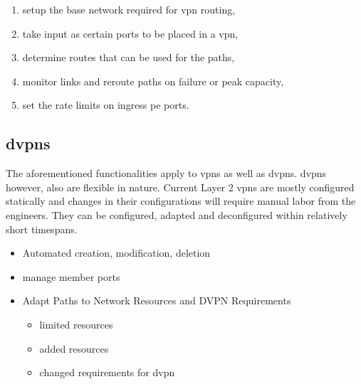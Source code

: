 \begin{enumerate}
	\item setup the base network required for \ac{vpn} routing,
	\item take input as certain ports to be placed in a \ac{vpn},
	\item determine routes that can be used for the paths,
	\item monitor links and reroute paths on failure or peak capacity,
	\item set the rate limits on ingress \ac{pe} ports.
\end{enumerate}





\subsection{\acsp{dvpn}} %
\label{sub:dvpn}





The aforementioned functionalities apply to \acp{vpn} as well as \acp{dvpn}. \acp{dvpn} however, also are flexible in nature. 
Current Layer 2 \acp{vpn} are mostly configured statically and changes in their configurations will require manual labor from the engineers. 
They can be configured, adapted and deconfigured within relatively short timespans. 


\begin{itemize}
	\item Automated creation, modification, deletion
	\item manage member ports
	\item Adapt Paths to Network Resources and DVPN Requirements
	\begin{itemize}
		\item limited resources
		\item added resources
		\item changed requirements for \ac{dvpn}
	\end{itemize}
\end{itemize}


